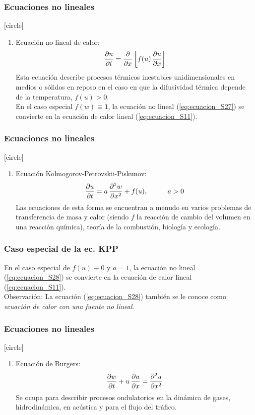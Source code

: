 \documentclass[12pt]{beamer}
\begin{document}
\begin{frame}
\frametitle{Ecuaciones no lineales}
[circle]
\begin{enumerate}[<+->]
\item Ecuación no lineal de calor:
\pause
\begin{align}
\pdv{u}{t} = \pdv{x} \left[ f(u) \, \pdv{u}{x} \right]
\label{eq:ecuacion_S27}  
\end{align}
Esta ecuación describe procesos térmicos inestables unidimensionales en medios o sólidos en reposo en el caso en que la difusividad térmica depende de la temperatura, $f (u)> 0$. 
\\
\bigskip
\pause
En el caso especial $f (w) \equiv 1$, la ecuación no lineal (\ref{eq:ecuacion_S27}) se convierte en la ecuación de calor lineal (\ref{eq:ecuacion_S11}).
\seti
\end{enumerate}
\end{frame}
\begin{frame}
\frametitle{Ecuaciones no lineales}
[circle]
\begin{enumerate}[<+->]
\conti
\item Ecuación Kolmogorov-Petrovskii-Piskunov:
\pause
\begin{align}
\pdv{u}{t} = a \, \pdv[2]{w}{x} + f(u), \hspace{1cm} a > 0
\label{eq:ecuacion_S28}
\end{align}
Las ecuaciones de esta forma se encuentran a menudo en varios problemas de transferencia de masa y calor (siendo $f$ la reacción de cambio del volumen en una reacción química), teoría de la combustión, biología y ecología.
\seti
\end{enumerate}
\end{frame}
\begin{frame}
\frametitle{Caso especial de la ec. KPP}
En el caso especial de $f (u) \equiv 0$ y $a = 1$, la ecuación no lineal (\ref{eq:ecuacion_S28}) se convierte en la ecuación de calor lineal (\ref{eq:ecuacion_S11}).
\\
\bigskip
\pause
Observación: La ecuación (\ref{eq:ecuacion_S28}) también se le conoce como \emph{ecuación de calor con una fuente no lineal}.
\end{frame}
\begin{frame}
\frametitle{Ecuaciones no lineales}
[circle]
\begin{enumerate}[<+->]
\conti
\item Ecuación de Burgers:
\pause
\begin{align}
\pdv{w}{t} + u \, \pdv{u}{x} = \pdv[2]{u}{x}
\label{eq:ecuacion_S29}
\end{align}
Se ocupa para describir procesos ondulatorios en la dinámica de gases, hidrodinámica, en acústica y para el flujo del tráfico.
\seti
\end{enumerate}
\end{frame}
\end{document}
